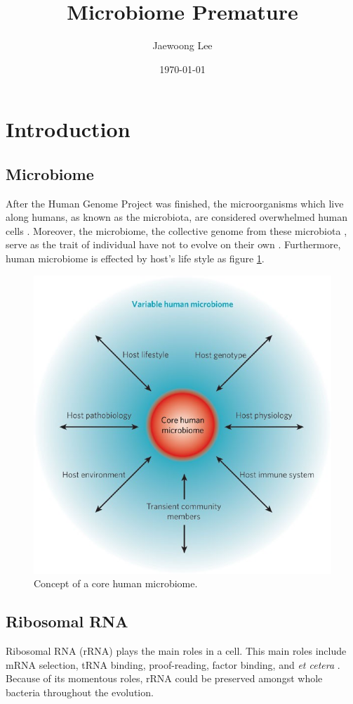 \documentclass[a4paper]{article}
\title{Microbiome Premature}
\author{Jaewoong Lee}
\date{\today}
\begin{document}
   	\maketitle
    \newpage

    \tableofcontents
    \listoftables
    \listoffigures
    \newpage

    \section{Introduction}
        \subsection{Microbiome}
            After the Human Genome Project was finished, the microorganisms which live along humans, as known as the microbiota, are considered overwhelmed human cells \cite{micro1}. Moreover, the microbiome, the collective genome from these microbiota \cite{micro2}, serve as the trait of individual have not to evolve on their own \cite{micro1}. Furthermore, human microbiome is effected by host's life style as figure \ref{fig:microbiome}.

            \begin{figure}[p]
                \centering
                \includegraphics[width=0.4 \linewidth]{figures/microbiome.jpg}
                \caption{Concept of a core human microbiome. \protect \cite{micro1}}
                \label{fig:microbiome}
            \end{figure}

        \subsection[rRNA]{Ribosomal RNA}
            Ribosomal RNA (rRNA) plays the main roles in a cell. This main roles include mRNA selection, tRNA binding, proof-reading, factor binding, and \textit{et cetera} \cite{rrna2}. Because of its momentous roles, rRNA could be preserved amongst whole bacteria throughout the evolution.
\end{document}
